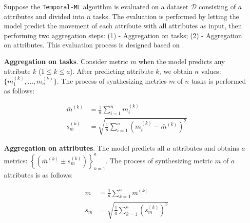 
Suppose the \verb|Temporal-ML| algorithm is evaluated on a dataset $\mathcal{D}$ consisting of $a$ attributes and divided into $n$ tasks. The evaluation is performed by letting the model predict the movement of each attribute with all attributes as input, then performing two aggregation steps: (1) - Aggregation on tasks; (2) - Aggregation on attributes. This evaluation process is designed based on \cite{challu2023nhits}.


\textbf{Aggregation on tasks}. Consider metric $m$ when the model predicts any attribute $k$ ($1\leq k \leq a$). After predicting attribute $k$, we obtain $n$ values: $\{m^{(k)}_1,\dots,m^{(k)}_n\}$. The process of synthesizing metrics $m$ of $n$ tasks is performed as follows:

\begin{align}
    \bar{m}^{(k)} &= \frac{1}{n}\sum_{i=1}^n{m^{(k)}_i} \label{eq:mean_task}\\
    s^{(k)}_m &= \sqrt{\frac{1}{n} \sum_{i=1}^n{(m^{(k)}_i - \bar{m}^{(k)})^2}} \label{eq:std_task}
\end{align}


\textbf{Aggregation on attributes}. The model predicts all $a$ attributes and obtains $a$ metrics: $\left\{ \left( \bar{m}^{(k)}\pm s^{(k)}_m \right) \right\}_{k=1}^a$. The process of synthesizing metric $m$ of $a$ attributes is as follows:

\begin{align}
    \bar{m} &= \frac{1}{a}\sum_{k=1}^a{\bar{m}^{(k)}} \label{eq:mean_att}\\
    s_m &= \sqrt{\frac{1}{a} \sum_{k=1}^a{(s^{(k)}_m)^2}} \label{eq:std:att}
\end{align}

